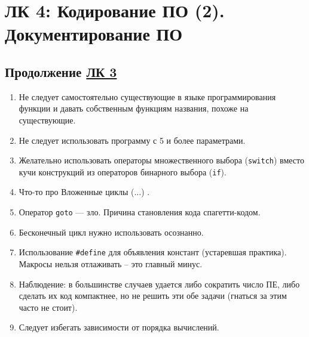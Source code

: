 \documentclass[a4paper, 12pt]{article}
\newcommand{\code}[1]{\texttt{#1}} %
\begin{document}
\section{ЛК 4: Кодирование ПО (2). Документирование ПО}
\label{sec:l4}

\subsection*{Продолжение \hyperref[sec:l3]{ЛК 3}}    

\begin{enumerate}[start=19]
    \item Не следует самостоятельно существующие в языке программирования функции и давать собственным функциям названия, похоже на существующие.
    \item Не следует использовать программу с 5 и более параметрами.
    \item Желательно использовать операторы множественного выбора (\code{switch}) вместо кучи конструкций из операторов бинарного выбора (\code{if}).
    \item Что-то про Вложенные циклы (...) .
    \item Оператор \code{goto} --- зло. Причина становления кода спагетти-кодом.
    \item Бесконечный цикл нужно использовать осознанно.
    \item Использование \code{\#define} для объявления констант (устаревшая практика). Макросы нельзя отлаживать -- это главный минус.
    \item Наблюдение: в большинстве случаев удается либо сократить число ПЕ, либо сделать их код компактнее, но не решить эти обе задачи (гнаться за этим часто не стоит).
    \item Следует избегать зависимости от порядка вычислений. 
\end{enumerate}
\end{document}
